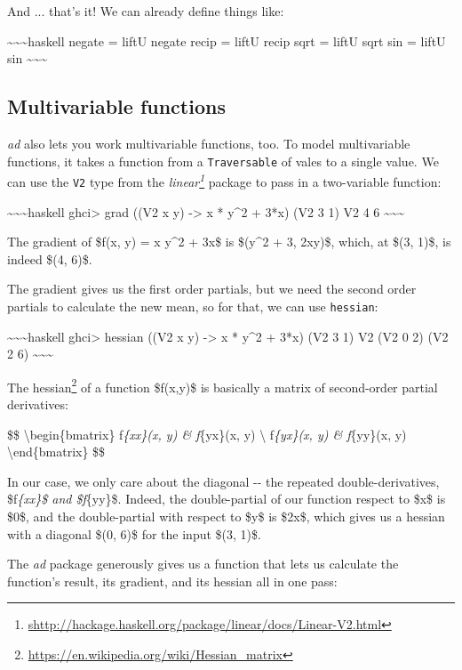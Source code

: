 \documentclass[]{article}
\renewcommand{\href}[2]{#2\footnote{\url{#1}}}
\begin{document}
And ... that's it! We can already define things like:

\textasciitilde{}\textasciitilde{}\textasciitilde{}haskell negate = liftU negate
recip = liftU recip sqrt = liftU sqrt sin = liftU sin
\textasciitilde{}\textasciitilde{}\textasciitilde{}

\subsection{Multivariable functions}

\emph{ad} also lets you work multivariable functions, too. To model
multivariable functions, it takes a function from a \texttt{Traversable} of
vales to a single value. We can use the \texttt{V2} type from the
\emph{\href{shttp://hackage.haskell.org/package/linear/docs/Linear-V2.html}{linear}}
package to pass in a two-variable function:

\textasciitilde{}\textasciitilde{}\textasciitilde{}haskell ghci\textgreater{}
grad ((V2 x y) -\textgreater{} x * y\^{}2 + 3*x) (V2 3 1) V2 4 6
\textasciitilde{}\textasciitilde{}\textasciitilde{}

The gradient of \$f(x, y) = x y\^{}2 + 3x\$ is \$(y\^{}2 + 3, 2xy)\$, which, at
\$(3, 1)\$, is indeed \$(4, 6)\$.

The gradient gives us the first order partials, but we need the second order
partials to calculate the new mean, so for that, we can use \texttt{hessian}:

\textasciitilde{}\textasciitilde{}\textasciitilde{}haskell ghci\textgreater{}
hessian ((V2 x y) -\textgreater{} x * y\^{}2 + 3*x) (V2 3 1) V2 (V2 0 2) (V2 2
6) \textasciitilde{}\textasciitilde{}\textasciitilde{}

The \href{https://en.wikipedia.org/wiki/Hessian_matrix}{hessian} of a function
\$f(x,y)\$ is basically a matrix of second-order partial derivatives:

\$\$ \textbackslash{}begin\{bmatrix\} f\emph{\{xx\}(x, y) \& f}\{yx\}(x, y)
\textbackslash{} f\emph{\{yx\}(x, y) \& f}\{yy\}(x, y)
\textbackslash{}end\{bmatrix\} \$\$

In our case, we only care about the diagonal -\/- the repeated
double-derivatives, \$f\emph{\{xx\}\$ and \$f}\{yy\}\$. Indeed, the
double-partial of our function respect to \$x\$ is \$0\$, and the double-partial
with respect to \$y\$ is \$2x\$, which gives us a hessian with a diagonal \$(0,
6)\$ for the input \$(3, 1)\$.

The \emph{ad} package generously gives us a function that lets us calculate the
function's result, its gradient, and its hessian all in one pass:
\end{document}
